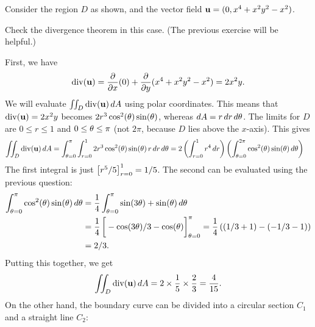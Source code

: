 \documentclass[a4paper]{amsart}
\renewenvironment{solution}{\SolutionInline}{\endSolutionInline}
\begin{document}
\begin{exercise}
 Consider the region $D$ as shown, and the vector field
 $\mathbf{u}=(0,x^4+x^2y^2-x^2)$.
 \begin{center}
 \end{center}
 Check the divergence theorem in this case.  (The previous exercise
 will be helpful.)
\end{exercise}
\begin{solution}
 First, we have
 \[ \operatorname{div}(\mathbf{u}) = \frac{\partial}{\partial x}(0) + \frac{\partial}{\partial y}(x^4+x^2y^2-x^2) = 2x^2y. \]
 We will evaluate $\iint_D\operatorname{div}(\mathbf{u})\,dA$ using polar coordinates.  This
 means that $\operatorname{div}(\mathbf{u})=2x^2y$ becomes $2r^3\cos^2(\theta)\sin(\theta)$, whereas
 $dA=r\,dr\,d\theta$.  The limits for $D$ are $0\leq r\leq 1$ and
 $0\leq\theta\leq\pi$ (not $2\pi$, because $D$ lies above the
 $x$-axis).  This gives
 \begin{align*}
  \iint_D\operatorname{div}(\mathbf{u})\,dA 
   &= \int_{\theta=0}^{\pi}\int_{r=0}^1 2r^3\cos^2(\theta)\sin(\theta)\,r\,dr\,d\theta 
    = 2 \left(\int_{r=0}^1 r^4\,dr\right)
       \left(\int_{\theta=0}^{2\pi}\cos^2(\theta)\sin(\theta)\,d\theta\right)
 \end{align*}
 The first integral is just $\CH{r^5/5}_{r=0}^1=1/5$.  The second can
 be evaluated using the previous question:
 \begin{align*}
  \int_{\tht=0}^{\pi}\cos^2(\tht)\sin(\tht)\,d\tht &= 
   \frac{1}{4}\int_{\tht=0}^{\pi}\sin(3\tht)+\sin(\tht)\,d\tht \\
   &= \frac{1}{4}\CH{-\cos(3\tht)/3-\cos(\tht)}_{\tht=0}^\pi
    = \frac{1}{4}\left((1/3+1)-(-1/3-1)\right) \\
   &= 2/3.
 \end{align*}
 Putting this together, we get 
 \[ \iint_D\operatorname{div}(\mathbf{u})\,dA  = 2 \times \frac{1}{5} \times \frac{2}{3}
      = \frac{4}{15}.
 \]
 On the other hand, the boundary curve can be divided into a circular
 section $C_1$ and a straight line $C_2$:
 \begin{center}
\end{center}
\end{solution}
\end{document}
